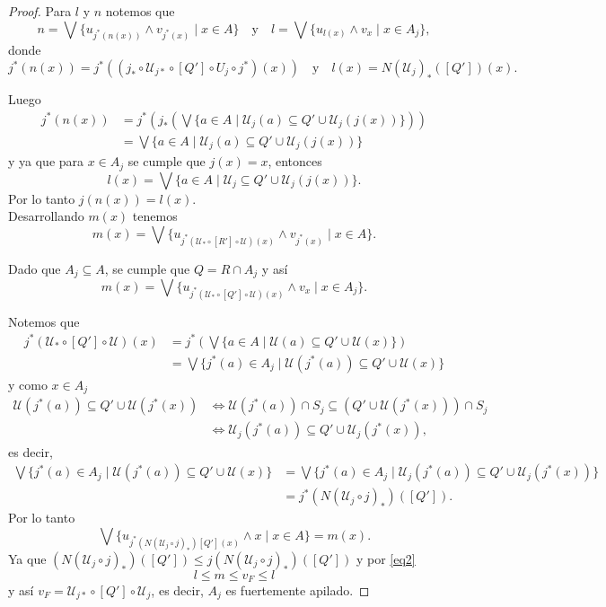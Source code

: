 \documentclass[12pt]{article}
\begin{document}
\begin{proof}
Para $l$ y $n$ notemos que
\[
n=\bigvee\{u_{j^*(n(x))}\wedge v_{j^*(x)}\mid x\in A\}\quad \text{y}\quad l=\bigvee\{u_{l(x)}\wedge v_x\mid x\in A_j\},
\]
donde 
\[
j^*(n(x))=j^*((j_*\circ \mathcal{U}_{j*}\circ [Q']\circ U_j\circ j^*)(x))\quad \text{y}\quad l(x)=N(\mathcal{U}_j)_*([Q'])(x).
\]

Luego
\[
\begin{split}
j^*(n(x))&=j^*(j_*(\bigvee\{a\in A\mid \mathcal{U}_j(a)\subseteq Q'\cup \mathcal{U}_j(j(x))\}))\\
&= \bigvee\{a\in A\mid \mathcal{U}_j(a)\subseteq Q'\cup \mathcal{U}_j(j(x))\}
\end{split}
\]
y ya que para $x\in A_j$ se cumple que $j(x)=x$, entonces
\[
l(x)=\bigvee\{a\in A\mid \mathcal{U}_j\subseteq Q'\cup \mathcal{U}_j(j(x))\}.
\]
Por lo tanto $j(n(x))=l(x)$.\\

Desarrollando $m(x)$ tenemos
\[
m(x)=\bigvee\{u_{j^*(\mathcal{U}_*\circ [R']\circ\mathcal{U})(x)}\wedge v_{j^*(x)}\mid x\in A\}.
\]

Dado que $A_j\subseteq A$, se cumple que $Q=R\cap A_j$ y así
\[
m(x)=\bigvee\{u_{j^*(\mathcal{U}_*\circ [Q']\circ\mathcal{U})(x)}\wedge v_x\mid x\in A_j\}.
\]

Notemos que 
\[
\begin{split}
j^*(\mathcal{U}_*\circ [Q']\circ\mathcal{U})(x)&= j^*(\bigvee\{a\in A\mid \mathcal{U}(a)\subseteq Q'\cup \mathcal{U}(x)\})\\
&=\bigvee\{j^*(a)\in A_j\mid \mathcal{U}(j^*(a))\subseteq Q'\cup \mathcal{U}(x)\}
\end{split}
\]
y como $x\in A_j$
\[
\begin{split}
\mathcal{U}(j^*(a))\subseteq Q'\cup \mathcal{U}(j^*(x))&\iff \mathcal{U}(j^*(a))\cap S_j\subseteq (Q'\cup \mathcal{U}(j^*(x)))\cap S_j\\
&\iff \mathcal{U}_j(j^*(a))\subseteq Q'\cup \mathcal{U}_j(j^*(x)),
\end{split}
\]
es decir, 
\[
\begin{split}
\bigvee\{j^*(a)\in A_j\mid \mathcal{U}(j^*(a))\subseteq Q'\cup \mathcal{U}(x)\}&=\bigvee\{j^*(a)\in A_j\mid \mathcal{U}_j(j^*(a))\subseteq Q'\cup \mathcal{U}_j(j^*(x))\}\\
&=j^*(N(\mathcal{U}_j\circ j)_*)([Q']).
\end{split}
\]
Por lo tanto 
\[
\bigvee\{u_{j^*(N(\mathcal{U}_j\circ j)_*)[Q'](x)}\wedge x\mid x\in A\}=m(x).
\]
Ya que $(N(\mathcal{U}_j\circ j)_*)([Q'])\leq j(N(\mathcal{U}_j\circ j)_*)([Q'])$ y por \eqref{eq2} 
\[
l\leq m\leq v_F\leq l
\]
y así $v_F=\mathcal{U}_{j*}\circ [Q']\circ \mathcal{U}_j$, es decir, $A_j$ es fuertemente apilado.
\end{proof}
\end{document}
